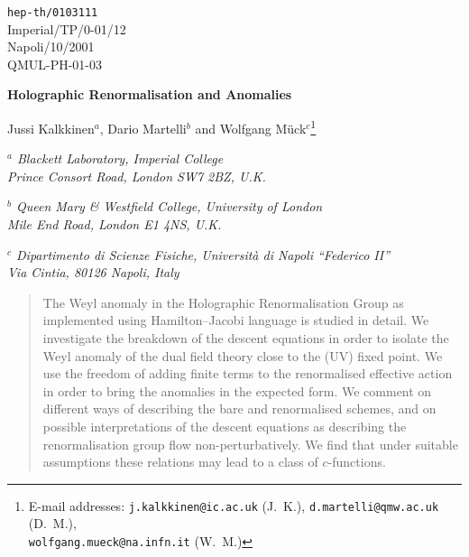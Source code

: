 \documentclass[a4paper,12pt]{article}
\begin{document}
\providecommand{\e}[1]{\mathrm{e}^{#1}}

\begin{titlepage}

\begin{flushleft}
       \hfill                      {\tt hep-th/0103111}\\ 
       \hfill                       Imperial/TP/0-01/12 \\
       \hfill                       Napoli/10/2001 \\
       \hfill                       QMUL-PH-01-03 \\ 
\end{flushleft}
\vspace*{8mm}

\begin{center}
\textbf{\LARGE Holographic Renormalisation and Anomalies}\\
\vspace*{14mm}

{\large Jussi Kalkkinen$^a$, 
Dario Martelli$^b$ 
and Wolfgang M\"uck$^c$\footnote{E-mail addresses: 
\texttt{j.kalkkinen@ic.ac.uk} (J.~K.), 
\texttt{d.martelli@qmw.ac.uk} (D.~M.), \\
\texttt{wolfgang.mueck@na.infn.it} (W.~M.)}} \\
\vspace*{6mm}

\emph{${}^a$ Blackett Laboratory, Imperial College} \\
\emph{       Prince Consort Road, London SW7 2BZ, U.K.}
\vspace*{2mm}

\emph{${}^b$ Queen Mary \& Westfield College, University of London} \\
\emph{       Mile End Road, London E1 4NS, U.K.}
\vspace*{2mm}

\emph{${}^c$ Dipartimento di Scienze Fisiche, Universit\`a di
             Napoli ``Federico II''} \\
\emph{       Via Cintia, 80126 Napoli, Italy}

\vspace*{10mm}
\end{center}



\begin{abstract}
\noindent
The Weyl anomaly in the Holographic Renormalisation Group 
as implemented using Hamilton--Jacobi language is studied in detail.  
We investigate the breakdown of the descent equations in order to isolate   
the Weyl anomaly of the dual field theory close to the (UV) fixed point. 
We use the freedom of adding finite terms to the renormalised effective
action in order to bring the anomalies in the expected form.
We comment on different ways of describing the 
bare and renormalised schemes, and on possible interpretations of the descent
equations as describing the renormalisation group flow non-perturbatively.
We find that under suitable assumptions these relations may lead to a class of 
$c$-functions.
\end{abstract}

\end{titlepage}
\end{document}
